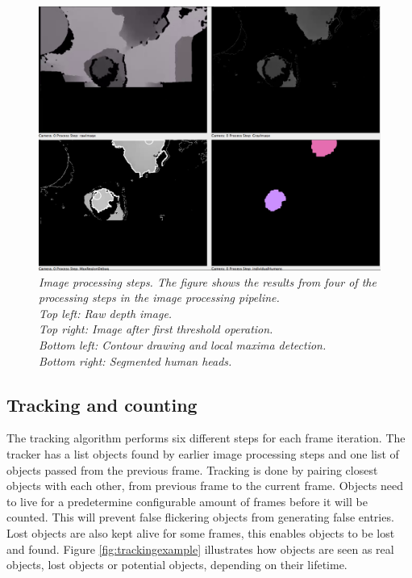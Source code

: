 \begin{figure}[htb]
	\centering
	\includegraphics[width=\linewidth]{images/image_processing_steps.png}
	\caption[Image processing steps]{\textit{Image processing steps. The figure shows the results from four of the processing steps in the image processing pipeline.\\
		Top left: Raw depth image.\\ 
		Top right: Image after first threshold operation.\\ 
		Bottom left: Contour drawing and local maxima detection.\\ 
		Bottom right: Segmented human heads.}}
	\label{fig:image_processing_steps}  %
\end{figure}

\newpage
\subsection{Tracking and counting}
The tracking algorithm performs six different steps for each frame iteration. The tracker has a list objects found by earlier image processing steps and one list of objects passed from the previous frame. Tracking is done by pairing closest objects with each other, from previous frame to the current frame. Objects need to live for a predetermine configurable amount of frames before it will be counted. This will prevent false flickering objects from generating false entries. Lost objects are also kept alive for some frames, this enables objects to be lost and found. Figure \ref{fig:trackingexample} illustrates how objects are seen as real objects, lost objects or potential objects, depending on their lifetime. 


